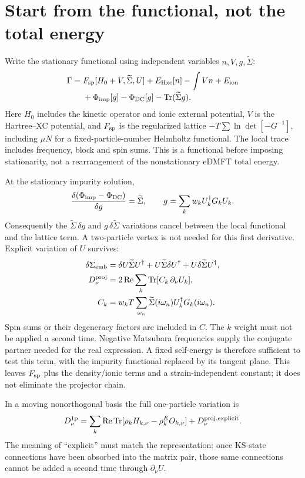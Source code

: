 \documentclass[11pt]{article}
\newcommand{\Tr}{\operatorname{Tr}}
\newcommand{\Rea}{\operatorname{Re}}
\newcommand{\dd}{\partial_\nu}
\newcommand{\Sig}{\widetilde\Sigma}
\begin{document}
\section{Start from the functional, not the total energy}
Write the stationary functional using independent variables $n,V,g,\Sig$:
\begin{align}
\Gamma={}&F_{\rm sp}[H_0+V,\Sig,U]+E_{\rm Hxc}[n]-\int Vn
 +E_{\rm ion}\notag\\[-2pt]
 &+\Phi_{\rm imp}[g]-\Phi_{\rm DC}[g]-\Tr(\Sig g).
\label{eq:Gamma}
\end{align}
Here $H_0$ includes the kinetic operator and ionic external potential, $V$ is
the Hartree--XC potential, and $F_{\rm sp}$ is the regularized lattice
$-T\sum\ln\det[-G^{-1}]$, including $\mu N$ for a fixed-particle-number
Helmholtz functional. The local trace includes frequency, block and spin sums.
This is a functional before imposing stationarity, not a rearrangement of
the nonstationary eDMFT total energy.

At the stationary impurity solution,
\begin{equation}
\frac{\delta(\Phi_{\rm imp}-\Phi_{\rm DC})}{\delta g}=\Sig,
\qquad g=\sum_k w_k U_k^\dagger G_k U_k.
\end{equation}
Consequently the $\Sig\,\delta g$ and $g\,\delta\Sig$ variations cancel
between the local functional and the lattice term. A two-particle vertex
is not needed for this first derivative. Explicit variation of $U$ survives:
\begin{align}
\delta\Sigma_{\rm emb}
 &=\delta U\Sig U^\dagger+U\Sig\delta U^\dagger+U\delta\Sig U^\dagger,\\
D^{\rm proj}_\nu
 &=2\Rea\sum_k\Tr[C_k\,\dd U_k],\label{eq:D}\\
 C_k&=w_k T\sum_{\omega_n}\Sig(i\omega_n)U_k^\dagger G_k(i\omega_n).
\label{eq:C}
\end{align}
Spin sums or their degeneracy factors are included in $C$. The $k$ weight
must not be applied a second time. Negative Matsubara frequencies supply the
conjugate partner needed for the real expression. A fixed self-energy is
therefore sufficient to test this term, with the impurity functional replaced
by its tangent plane. This leaves $F_{\rm sp}$ plus the density/ionic terms
and a strain-independent constant; it does not eliminate the projector chain.

In a moving nonorthogonal basis the full one-particle variation is
\begin{equation}
D^{\rm 1p}_\nu=\sum_k\Rea\Tr[\rho_k H_{k,\nu}-\rho^E_k O_{k,\nu}]
                  +D^{\rm proj,explicit}_\nu .\label{eq:master}
\end{equation}
The meaning of ``explicit'' must match the representation: once KS-state
connections have been absorbed into the matrix pair, those same connections
cannot be added a second time through $\dd U$.
\end{document}
